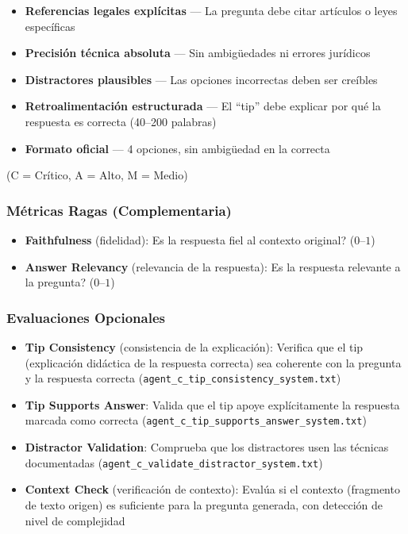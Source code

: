 \documentclass[10pt,twocolumn,letterpaper]{article}
\begin{document}
\begin{itemize}[nosep,leftmargin=*]
  \item[\textbf{C}] \textbf{Referencias legales expl\'icitas} --- La pregunta debe
        citar art\'iculos o leyes espec\'ificas
  \item[\textbf{C}] \textbf{Precisi\'on t\'ecnica absoluta} --- Sin ambig\"uedades ni
        errores jur\'idicos
  \item[\textbf{A}] \textbf{Distractores plausibles} --- Las opciones incorrectas
        deben ser cre\'ibles
  \item[\textbf{A}] \textbf{Retroalimentaci\'on estructurada} --- El ``tip'' debe
        explicar por qu\'e la respuesta es correcta (40--200 palabras)
  \item[\textbf{M}] \textbf{Formato oficial} --- 4 opciones, sin ambig\"uedad en
        la correcta
\end{itemize}

{\scriptsize (C = Cr\'itico, A = Alto, M = Medio)}

\subsubsection{M\'etricas Ragas (Complementaria)}
\begin{itemize}[nosep,leftmargin=*]
  \item \textbf{Faithfulness} (fidelidad): \textquestiondown Es la respuesta fiel al contexto original? ($0$--$1$)
  \item \textbf{Answer Relevancy} (relevancia de la respuesta): \textquestiondown Es la respuesta relevante a la pregunta? ($0$--$1$)
\end{itemize}

\subsubsection{Evaluaciones Opcionales}

\begin{itemize}[nosep,leftmargin=*]
  \item \textbf{Tip Consistency} (consistencia de la explicaci\'on): Verifica que el tip
        (explicaci\'on did\'actica de la respuesta correcta) sea coherente con la pregunta
        y la respuesta correcta (\texttt{agent\_c\_tip\_consistency\_system.txt})
  \item \textbf{Tip Supports Answer}: Valida que el tip apoye expl\'icitamente la
        respuesta marcada como correcta (\texttt{agent\_c\_tip\_supports\_answer\_system.txt})
  \item \textbf{Distractor Validation}: Comprueba que los distractores usen las
        t\'ecnicas documentadas (\texttt{agent\_c\_validate\_distractor\_system.txt})
  \item \textbf{Context Check} (verificaci\'on de contexto): Eval\'ua si el contexto
        (fragmento de texto origen) es suficiente para la pregunta generada,
        con detecci\'on de nivel de complejidad
\end{itemize}
\end{document}
